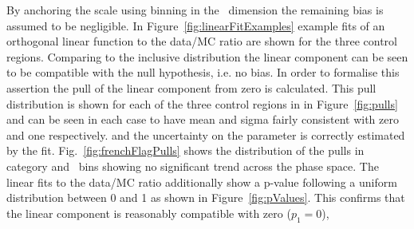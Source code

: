 By anchoring the scale using binning in the \scalht~dimension the remaining
bias is assumed to be negligible. In Figure~\ref{fig:linearFitExamples} 
example fits of an orthogonal linear function to the data/MC ratio 
are shown for the three control regions. Comparing to the inclusive distribution 
the linear component can be seen to be compatible with the null hypothesis, 
i.e. no bias. In order to formalise this assertion 
the pull of the linear component from zero is calculated.
This pull distribution is shown for each of the three control regions in
in Figure~\ref{fig:pulls} and can be seen in each case to have mean and sigma fairly 
consistent with zero and one respectively. 
and the uncertainty on the parameter is correctly estimated by the fit.
Fig.~\ref{fig:frenchFlagPulls} shows the distribution of the pulls 
in category and \scalht~bins showing no significant trend across the phase space.
The linear fits to the data/MC ratio additionally show a p-value following 
a uniform distribution between 0 and 1 as shown in Figure~\ref{fig:pValues}.
This confirms that the linear component is reasonably compatible with zero ($p_1 = 0$), %


